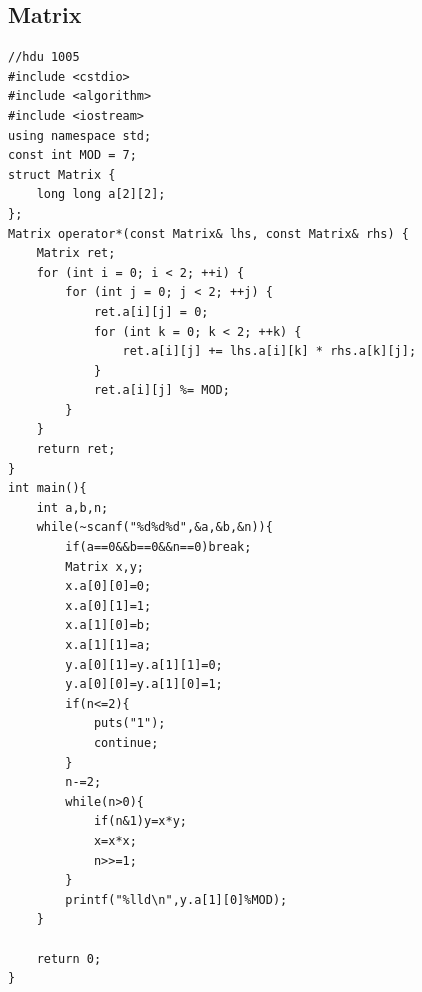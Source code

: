 \documentclass[twoside]{article}
\begin{document}
\subsection{Matrix}
\begin{lstlisting}
//hdu 1005
#include <cstdio>
#include <algorithm>
#include <iostream>
using namespace std;
const int MOD = 7;
struct Matrix {
    long long a[2][2];
};
Matrix operator*(const Matrix& lhs, const Matrix& rhs) {
    Matrix ret;
    for (int i = 0; i < 2; ++i) {
        for (int j = 0; j < 2; ++j) {
            ret.a[i][j] = 0;
            for (int k = 0; k < 2; ++k) {
                ret.a[i][j] += lhs.a[i][k] * rhs.a[k][j];
            }
            ret.a[i][j] %= MOD;
        }
    }
    return ret;
}
int main(){
    int a,b,n;
    while(~scanf("%d%d%d",&a,&b,&n)){
        if(a==0&&b==0&&n==0)break;
        Matrix x,y;
        x.a[0][0]=0;
        x.a[0][1]=1;
        x.a[1][0]=b;
        x.a[1][1]=a;
        y.a[0][1]=y.a[1][1]=0;
        y.a[0][0]=y.a[1][0]=1;
        if(n<=2){
            puts("1");
            continue;
        }
        n-=2;
        while(n>0){
            if(n&1)y=x*y;
            x=x*x;
            n>>=1;
        }
        printf("%lld\n",y.a[1][0]%MOD);
    }
    
    return 0;
}
\end{lstlisting}
\end{document}
